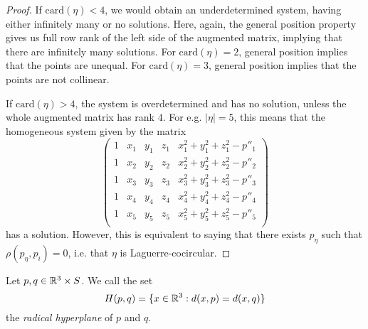 \begin{proof}
	If $\mathrm{card}(\eta)<4$, we would obtain an underdetermined system, having either infinitely many or no solutions.  Here, again, the general position property gives us full row rank of the left side of the augmented matrix, implying that there are infinitely many solutions. For $\mathrm{card}(\eta)=2$, general position implies that the points are unequal. For $\mathrm{card}(\eta) =3$, general position implies that the points are not collinear.


	If $\mathrm{card}(\eta)>4$, the system is overdetermined and has no solution, unless the whole augmented matrix has rank $4$. For e.g. $|\eta|=5$, this means that the homogeneous system given by the matrix 
	\begin{equation}\label{circmat}
	\begin{pmatrix}
		1 & x_1 & y_1 & z_1 & x_1^2 + y_1^2 + z_1^2 - p''_1  \\
		1 & x_2 & y_2 & z_2 & x_2^2 + y_2^2 + z_2^2 - p''_2  \\
		1 & x_3 & y_3 & z_3 & x_3^2 + y_3^2 + z_3^2 - p''_3  \\
		1 & x_4 & y_4 & z_4 & x_4^2 + y_4^2 + z_4^2 - p''_4  \\
		1 & x_5 & y_5 & z_5 & x_5^2 + y_5^2 + z_5^2 - p''_5  \\
	\end{pmatrix}
	\end{equation}
	has a solution. However, this is equivalent to saying that there exists $p_\eta$ such that $\rho(p_\eta,p_i)=0$, i.e. that $\eta$ is Laguerre-cocircular.
\end{proof}

\begin{definition} Let $p,q \in {\mathbb R^3}\times S$. We call the set 
	$$H(p,q) = \{ x\in {\mathbb R^3}: d(x,p) = d(x,q) \}$$
	the \textit{radical hyperplane} of $p$ and $q$.
\end{definition}

